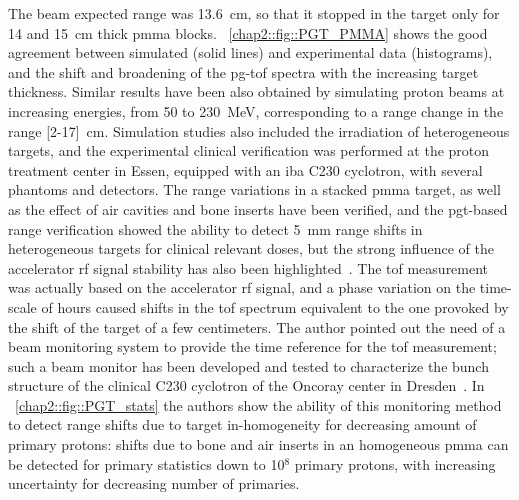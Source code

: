 The beam expected range was 13.6~cm, so that it stopped in the target only for 14 and 15~cm thick \gls{pmma} blocks. \figurename~\ref{chap2::fig::PGT_PMMA} shows the good agreement between simulated (solid lines) and experimental data (histograms), and the shift and broadening of the \gls{pg}-\gls{tof} spectra with the increasing target thickness. Similar results have been also obtained by simulating proton beams at increasing energies, from 50 to 230~MeV, corresponding to a range change in the range [2-17]~cm. Simulation studies also included the irradiation of heterogeneous targets, and the experimental clinical verification was performed at the proton treatment center in Essen, equipped with an \gls{iba} C230 cyclotron, with several phantoms and detectors. The range variations in a stacked \gls{pmma} target, as well as the effect of air cavities and bone inserts have been verified, and the \gls{pgt}-based range verification showed the ability to detect 5~mm range shifts in heterogeneous targets for clinical relevant doses, but the strong influence of the accelerator \gls{rf} signal stability has also been highlighted~\parencite{HuesoGonzalez2015b}. The \gls{tof} measurement was actually based on the accelerator \gls{rf} signal, and a phase variation on the time-scale of hours caused shifts in the \gls{tof} spectrum equivalent to the one provoked by the shift of the target of a few centimeters. The author pointed out the need of a beam monitoring system to provide the time reference for the \gls{tof} measurement; such a beam monitor has been developed and tested to characterize the bunch structure of the clinical C230 cyclotron of the Oncoray center in Dresden~\parencite{Petzoldt2016}. 
In \figurename~\ref{chap2::fig::PGT_stats} the authors show the ability of this monitoring method to detect range shifts due to target in-homogeneity for decreasing amount of primary protons: shifts due to bone and air inserts in an homogeneous \gls{pmma} can be detected for primary statistics down to 10$^8$ primary protons, with increasing uncertainty for decreasing number of primaries.  

